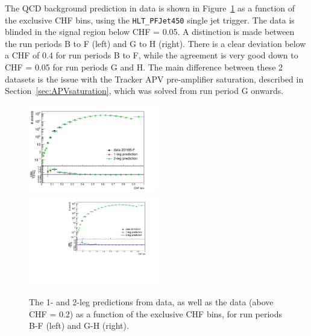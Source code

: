 The \ac{QCD} background prediction in data is shown in Figure~\ref{fig:prediction} as a function of the exclusive CHF bins, using the \texttt{HLT\_PFJet450} single jet trigger. The data is blinded in the signal region below CHF = 0.05. A distinction is made between the run periods B to F (left) and G to H (right). There is a clear deviation below a CHF of 0.4 for run periods B to F, while the agreement is very good down to CHF = 0.05 for run periods G and H. The main difference between these 2 datasets is the issue with the Tracker APV pre-amplifier saturation, described in Section~\ref{sec:APVsaturation}, which was solved from run period G onwards.

\begin{figure}[ht]
  \centering
  \includegraphics[width=0.5\textwidth]{figures/data_vs_prediction_BF_filters.pdf}\hfill%
  \includegraphics[width=0.5\textwidth]{figures/data_vs_prediction_GH_filters.pdf}
  \caption{The 1- and 2-leg predictions from data, as well as the data (above CHF = 0.2) as a function of the exclusive CHF bins, for run periods B-F (left) and G-H (right).}
  \label{fig:prediction}
\end{figure}

